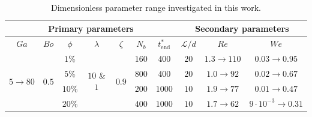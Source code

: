 \documentclass[11pt]{My_preprint}
\begin{document}
\begin{table}[h!]
    \centering
    \caption{Dimensionless parameter range investigated in this work.}
    \begin{tabular}{|ccccccc|ccc|}
        \hline
        \multicolumn{7}{|c}{Primary parameters} & \multicolumn{3}{||c|}{Secondary parameters}\\ \hline
        \multicolumn{1}{|c|}{$Ga$}                               & \multicolumn{1}{c|}{$Bo$}                   & \multicolumn{1}{c|}{$\phi$} & \multicolumn{1}{c|}{$\lambda$}                    & \multicolumn{1}{c|}{$\zeta$}                & \multicolumn{1}{c|}{$N_b$} & $t^*_\text{end}$ & \multicolumn{1}{||c|}{$\mathcal{L}/d$} & \multicolumn{1}{c|}{$Re$}  & $We$   \\ \hline
        \multicolumn{1}{|c|}{\multirow{4}{*}{$5\rightarrow 80$}} & \multicolumn{1}{c|}{\multirow{4}{*}{$0.5$}} & \multicolumn{1}{c|}{$1\%$}  & \multicolumn{1}{c|}{\multirow{4}{*}{$10$ \& $1$}} & \multicolumn{1}{c|}{\multirow{4}{*}{$0.9$}} & \multicolumn{1}{c|}{$160$} & $400$           & \multicolumn{1}{||c|}{$20$}            & \multicolumn{1}{c|}{$1.3\to 110$} & {$0.03\to 0.95$} \\ 
        \multicolumn{1}{|c|}{}                                   & \multicolumn{1}{c|}{}                       & \multicolumn{1}{c|}{$5\%$}  & \multicolumn{1}{c|}{}                             & \multicolumn{1}{c|}{}                       & \multicolumn{1}{c|}{$800$} & $400$           & \multicolumn{1}{||c|}{$20$}            & \multicolumn{1}{c|}{$1.0\to 92$} &  {$0.02\to 0.67$}\\ 
        \multicolumn{1}{|c|}{}                                   & \multicolumn{1}{c|}{}                       & \multicolumn{1}{c|}{$10\%$} & \multicolumn{1}{c|}{}                             & \multicolumn{1}{c|}{}                       & \multicolumn{1}{c|}{$200$} & $1000$           & \multicolumn{1}{||c|}{$10$}            & \multicolumn{1}{c|}{$1.9\to 77$}&  {$0.01\to 0.47$}\\ 
        \multicolumn{1}{|c|}{}                                   & \multicolumn{1}{c|}{}                       & \multicolumn{1}{c|}{$20\%$} & \multicolumn{1}{c|}{}                             & \multicolumn{1}{c|}{}                       & \multicolumn{1}{c|}{$400$} & $1000$           & \multicolumn{1}{||c|}{$10$}            & \multicolumn{1}{c|}{$1.7\to 62$}&  {$9\cdot 10^{-3}\to 0.31$}\\ \hline
        \end{tabular}
    \label{tab:simulations}
\end{table}
\end{document}
